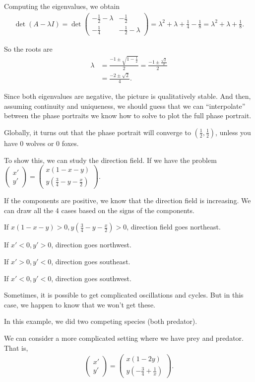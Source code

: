 \documentclass{article}
\newcommand{\mat}[1]{\begin{pmatrix}#1\end{pmatrix}}
\begin{document}
Computing the eigenvalues, we obtain
\begin{align*}
  \det (A - \lambda I) = \det \mat{- \frac{1}{2} - \lambda & - \frac{1}{2} \\ - \frac{1}{4} & - \frac{1}{2} - \lambda} = \lambda^2 + \lambda + \frac{1}{4} - \frac{1}{8} = \lambda^2 + \lambda + \frac{1}{8}.
\end{align*}

So the roots are
\begin{align*}
  \lambda &= \frac{- 1 \pm \sqrt{1 - \frac{1}{2}}}{2} = \frac{-1 \pm \frac{\sqrt{2}}{2}}{2} \\
  &= \frac{-2 \pm \sqrt{2}}{4}.
\end{align*}

Since both eigenvalues are negative, the picture is qualitatively stable.  And then, assuming continuity and uniqueness, we should guess that we can ``interpolate'' between the phase portraits we know how to solve to plot the full phase portrait.

Globally, it turns out that the phase portrait will converge to $ (\frac{1}{2}, \frac{1}{2})$, unless you have $0$ wolves or $0$ foxes.

To show this, we can study the direction field.  If we have the problem $\mat{x' \\ y'} = \mat{x(1-x-y) \\ y(\frac{3}{4} - y - \frac{x}{2})}$.

If the components are positive, we know that the direction field is increasing.  We can draw all the 4 cases based on the signs of the components.

If $x(1 - x - y) > 0, y(\frac{3}{4} - y- \frac{x}{2} ) > 0$, direction field goes northeast.

If $x' < 0, y' > 0$, direction goes northwest.

If $x' > 0, y' < 0$, direction goes southeast.

If $x' < 0, y' < 0$, direction goes southwest.

Sometimes, it is possible to get complicated oscillations and cycles.  But in this case, we happen to know that we won't get these.

In this example, we did two competing species (both predator).

We can consider a more complicated setting where we have prey and predator.  That is,
\begin{align*}
  \mat{x' \\ y'} = \mat{x (1 - 2y) \\ y(- \frac{3}{4} + \frac{1}{x})}.
\end{align*}
\end{document}
